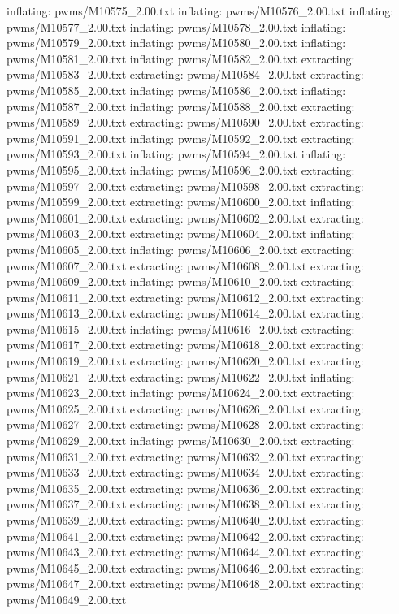 \documentclass[letterpaper,10pt,english]{sphinxmanual}
\begin{document}
{\begin{sphinxVerbatim}[commandchars=\\\{\}]
  inflating: pwms/M10575\_2.00.txt
  inflating: pwms/M10576\_2.00.txt
  inflating: pwms/M10577\_2.00.txt
  inflating: pwms/M10578\_2.00.txt
  inflating: pwms/M10579\_2.00.txt
  inflating: pwms/M10580\_2.00.txt
  inflating: pwms/M10581\_2.00.txt
  inflating: pwms/M10582\_2.00.txt
 extracting: pwms/M10583\_2.00.txt
 extracting: pwms/M10584\_2.00.txt
 extracting: pwms/M10585\_2.00.txt
  inflating: pwms/M10586\_2.00.txt
  inflating: pwms/M10587\_2.00.txt
  inflating: pwms/M10588\_2.00.txt
 extracting: pwms/M10589\_2.00.txt
 extracting: pwms/M10590\_2.00.txt
 extracting: pwms/M10591\_2.00.txt
  inflating: pwms/M10592\_2.00.txt
 extracting: pwms/M10593\_2.00.txt
  inflating: pwms/M10594\_2.00.txt
  inflating: pwms/M10595\_2.00.txt
  inflating: pwms/M10596\_2.00.txt
 extracting: pwms/M10597\_2.00.txt
 extracting: pwms/M10598\_2.00.txt
 extracting: pwms/M10599\_2.00.txt
 extracting: pwms/M10600\_2.00.txt
  inflating: pwms/M10601\_2.00.txt
 extracting: pwms/M10602\_2.00.txt
 extracting: pwms/M10603\_2.00.txt
 extracting: pwms/M10604\_2.00.txt
  inflating: pwms/M10605\_2.00.txt
  inflating: pwms/M10606\_2.00.txt
 extracting: pwms/M10607\_2.00.txt
 extracting: pwms/M10608\_2.00.txt
 extracting: pwms/M10609\_2.00.txt
  inflating: pwms/M10610\_2.00.txt
 extracting: pwms/M10611\_2.00.txt
 extracting: pwms/M10612\_2.00.txt
 extracting: pwms/M10613\_2.00.txt
 extracting: pwms/M10614\_2.00.txt
 extracting: pwms/M10615\_2.00.txt
  inflating: pwms/M10616\_2.00.txt
 extracting: pwms/M10617\_2.00.txt
 extracting: pwms/M10618\_2.00.txt
 extracting: pwms/M10619\_2.00.txt
 extracting: pwms/M10620\_2.00.txt
 extracting: pwms/M10621\_2.00.txt
 extracting: pwms/M10622\_2.00.txt
  inflating: pwms/M10623\_2.00.txt
  inflating: pwms/M10624\_2.00.txt
 extracting: pwms/M10625\_2.00.txt
 extracting: pwms/M10626\_2.00.txt
 extracting: pwms/M10627\_2.00.txt
 extracting: pwms/M10628\_2.00.txt
 extracting: pwms/M10629\_2.00.txt
  inflating: pwms/M10630\_2.00.txt
 extracting: pwms/M10631\_2.00.txt
 extracting: pwms/M10632\_2.00.txt
 extracting: pwms/M10633\_2.00.txt
 extracting: pwms/M10634\_2.00.txt
 extracting: pwms/M10635\_2.00.txt
 extracting: pwms/M10636\_2.00.txt
 extracting: pwms/M10637\_2.00.txt
 extracting: pwms/M10638\_2.00.txt
 extracting: pwms/M10639\_2.00.txt
 extracting: pwms/M10640\_2.00.txt
 extracting: pwms/M10641\_2.00.txt
 extracting: pwms/M10642\_2.00.txt
 extracting: pwms/M10643\_2.00.txt
 extracting: pwms/M10644\_2.00.txt
 extracting: pwms/M10645\_2.00.txt
 extracting: pwms/M10646\_2.00.txt
 extracting: pwms/M10647\_2.00.txt
 extracting: pwms/M10648\_2.00.txt
 extracting: pwms/M10649\_2.00.txt

\end{sphinxVerbatim}}
\end{document}
